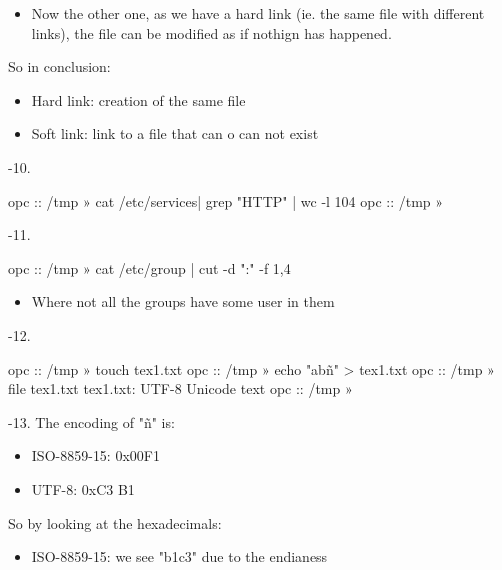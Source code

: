 \documentclass[a4paper]{article}
\begin{document}
\begin{itemize}
\item 
Now the other one, as we have a hard link (ie. the same file with different links), the file can be modified as if nothign has happened. 
\end{itemize}

So in conclusion:

\begin{itemize}
\item 
Hard link: creation of the same file
\item 
Soft link: link to a file that can o can not exist
\end{itemize}

{-\allowbreak}10. 

\begin{plain}
opc :: /tmp » cat /etc/services| grep "HTTP" | wc -l
104
opc :: /tmp » 
\end{plain}

{-\allowbreak}11.

\begin{plain}
opc :: /tmp » cat /etc/group | cut -d ":" -f 1,4  
\end{plain}

\begin{itemize}
\item 
Where not all the groups have some user in them
\end{itemize}

{-\allowbreak}12.

\begin{plain}
opc :: /tmp » touch tex1.txt  
opc :: /tmp » echo "abñ" > tex1.txt                                            
opc :: /tmp » file tex1.txt 
tex1.txt: UTF-8 Unicode text
opc :: /tmp » 
\end{plain}

{-\allowbreak}13. The encoding of "ñ" is:

\begin{itemize}
\item 
ISO{-\allowbreak}8859{-\allowbreak}15: 0x00F1
\item 
UTF{-\allowbreak}8: 0x\-C3 B1
\end{itemize}

So by looking at the hexadecimals:

\begin{itemize}
\item 
ISO{-\allowbreak}8859{-\allowbreak}15: we see "b1c3" due to the endianess
\end{itemize}
\end{document}

